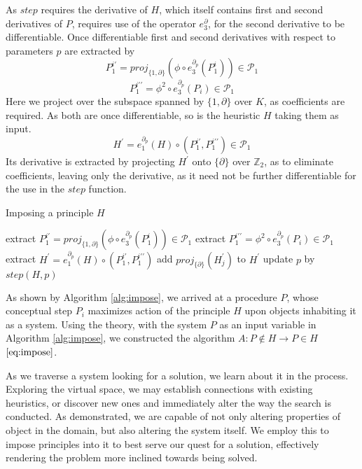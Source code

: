 \documentclass{article}
\newcommand{\dP}{\mathcal{P}}
\newcommand{\D}{\partial}
\begin{document}
As $step$ requires the derivative of $H$, which itself contains first and second derivatives of $P$, requires use of the operator $e^\D_3$, for the second derivative to be differentiable. Once differentiable first and second derivatives with respect to parameters $p$ are extracted by
\begin{equation}
P^{i\prime}_1=proj_{\{1,\D\}}\left(\phi\circ e^{\D_{p}}_3(P^i_1)\right)\in\dP_1
\end{equation}
\begin{equation}
P^{i\prime\prime}_1=\phi^2\circ e^{\D_p}_3(P_i)\in\dP_1
\end{equation}
Here we project over the subspace spanned by $\{1,\D\}$ over $K$, as coefficients are required. As both are once differentiable, so is the heuristic $H$ taking them as input.
\begin{equation}
H^\prime=e^{\D_p}_1(H)\circ(P^{i\prime}_1,P^{i\prime\prime}_1)\in\dP_1
\end{equation}
Its derivative is extracted by projecting $H^\prime$ onto $\{\D\}$ over $\mathbb{Z}_2$, as to eliminate coefficients, leaving only the derivative, as it need not be further differentiable for the use in the $step$ function.

\begin{algorithm}[h]
\caption{Imposing a principle $H$}
\label{alg:impose}
\begin{algorithmic}[1]
\State extract $P^{i\prime}_1=proj_{\{1,\D\}}\left(\phi\circ e^{\D_{p}}_3(P^i_1)\right)\in\dP_1$
\State extract $P^{i\prime\prime}_1=\phi^2\circ e^{\D_p}_3(P_i)\in\dP_1$
\State extract $H^\prime=e^{\D_p}_1(H)\circ(P^{i\prime}_1,P^{i\prime\prime}_1)$
\State add $proj_{\{\D\}}(H^\prime_j)$ to $H^\prime$
\EndFor
\State update $p$ by $step(H,p)$
\EndFor
\EndProcedure
\end{algorithmic}
\end{algorithm}

As shown by Algorithm \ref{alg:impose}, we arrived at a procedure $P$, whose conceptual step $P_i$ maximizes action of the principle $H$ upon objects inhabiting it as a system. Using the theory, with the system $P$ as an input variable in Algorithm \ref{alg:impose}, we constructed the algorithm $A:P\notin H\to P\in H$ $\eqref{eq:impose}$.

As we traverse a system looking for a solution, we learn about it in the process. Exploring the virtual space, we may establish connections with existing heuristics, or discover new ones and immediately alter the way the search is conducted. As demonstrated, we are capable of not only altering properties of object in the domain, but also altering the system itself. We employ this to impose principles into it to best serve our quest for a solution, effectively rendering the problem more inclined towards being solved.
\end{document}
